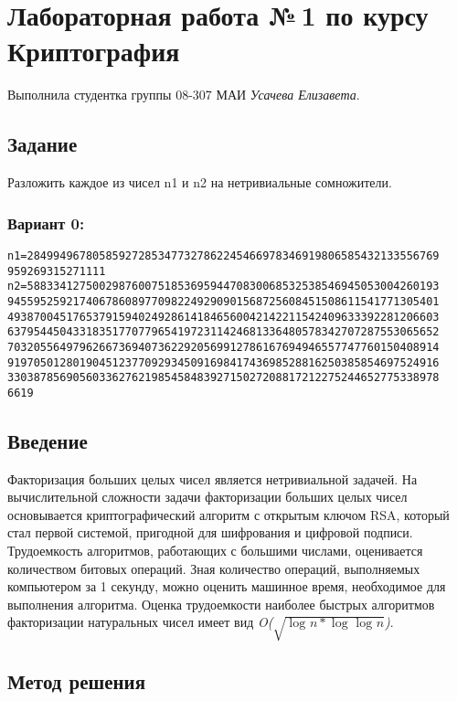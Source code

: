 \documentclass[12pt]{article}
\begin{document}
\section*{Лабораторная работа №\,1 по курсу Криптография}

Выполнила студентка группы 08-307 МАИ \textit{Усачева Елизавета}.

\subsection*{Задание}

Разложить каждое из чисел n1 и n2 на нетривиальные сомножители.

\subsubsection*{Вариант 0:}
\begin{lstlisting}
n1=284994967805859272853477327862245466978346919806585432133556769
959269315271111
n2=588334127500298760075185369594470830068532538546945053004260193 
945595259217406786089770982249290901568725608451508611541771305401
493870045176537915940249286141846560042142211542409633392281206603
637954450433183517707796541972311424681336480578342707287553065652
703205564979626673694073622920569912786167694946557747760150408914
919705012801904512377092934509169841743698528816250385854697524916
330387856905603362762198545848392715027208817212275244652775338978
6619
\end{lstlisting}


\subsection*{Введение}

Факторизация больших целых чисел является нетривиальной задачей. На вычислительной сложности задачи факторизации больших целых чисел основывается криптографический алгоритм с открытым ключом RSA, который стал первой системой, пригодной для шифрования и цифровой подписи. Трудоемкость алгоритмов, работающих с большими числами, оценивается количеством битовых операций. Зная количество операций, выполняемых компьютером за 1 секунду, можно оценить машинное время, необходимое для выполнения алгоритма. Оценка трудоемкости наиболее быстрых алгоритмов факторизации натуральных чисел имеет вид \textit{O(\exp $\sqrt{\log_{}n * \log_{}\log_{}n}$)}.

\subsection*{Метод решения}
\end{document}
